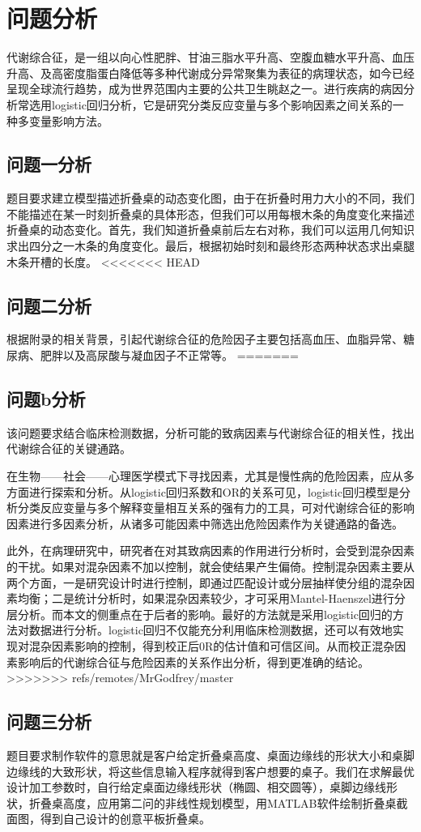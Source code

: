 \documentclass[bwprint]{cumcmthesis}
\begin{document}
\section{问题分析}
代谢综合征，是一组以向心性肥胖、甘油三脂水平升高、空腹血糖水平升高、血压升高、及高密度脂蛋白降低等多种代谢成分异常聚集为表征的病理状态，如今已经呈现全球流行趋势，成为世界范围内主要的公共卫生眺赵之一。进行疾病的病因分析常选用logistic回归分析，它是研究分类反应变量与多个影响因素之间关系的一种多变量影响方法。
\subsection{问题一分析}
题目要求建立模型描述折叠桌的动态变化图，由于在折叠时用力大小的不同，我们不能描述在某一时刻折叠桌的具体形态，但我们可以用每根木条的角度变化来描述折叠桌的动态变化。首先，我们知道折叠桌前后左右对称，我们可以运用几何知识求出四分之一木条的角度变化。最后，根据初始时刻和最终形态两种状态求出桌腿木条开槽的长度。
<<<<<<< HEAD
\subsection{问题二分析}
根据附录的相关背景，引起代谢综合征的危险因子主要包括高血压、血脂异常、糖尿病、肥胖以及高尿酸与凝血因子不正常等。
=======
\subsection{问题b分析}
该问题要求结合临床检测数据，分析可能的致病因素与代谢综合征的相关性，找出代谢综合征的关键通路。

在生物——社会——心理医学模式下寻找因素，尤其是慢性病的危险因素，应从多方面进行探索和分析。从logistic回归系数和OR的关系可见，logistic回归模型是分析分类反应变量与多个解释变量相互关系的强有力的工具，可对代谢综合征的影响因素进行多因素分析，从诸多可能因素中筛选出危险因素作为关键通路的备选。

此外，在病理研究中，研究者在对其致病因素的作用进行分析时，会受到混杂因素的干扰。如果对混杂因素不加以控制，就会使结果产生偏倚。控制混杂因素主要从两个方面，一是研究设计时进行控制，即通过匹配设计或分层抽样使分组的混杂因素均衡；二是统计分析时，如果混杂因素较少，才可采用Mantel-Haenszel进行分层分析。而本文的侧重点在于后者的影响。最好的方法就是采用logistic回归的方法对数据进行分析。logistic回归不仅能充分利用临床检测数据，还可以有效地实现对混杂因素影响的控制，得到校正后0R的估计值和可信区间。从而校正混杂因素影响后的代谢综合征与危险因素的关系作出分析，得到更准确的结论。
>>>>>>> refs/remotes/MrGodfrey/master
\subsection{问题三分析}
题目要求制作软件的意思就是客户给定折叠桌高度、桌面边缘线的形状大小和桌脚边缘线的大致形状，将这些信息输入程序就得到客户想要的桌子。我们在求解最优设计加工参数时，自行给定桌面边缘线形状（椭圆、相交圆等），桌脚边缘线形状，折叠桌高度，应用第二问的非线性规划模型，用MATLAB软件绘制折叠桌截面图，得到自己设计的创意平板折叠桌。
\end{document}
